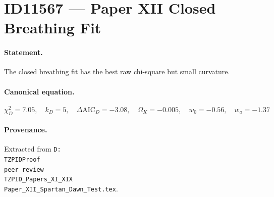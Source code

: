 \section*{ID11567 --- Paper XII Closed Breathing Fit}

\paragraph{Statement.}
The closed breathing fit has the best raw chi-square but small curvature.

\paragraph{Canonical equation.}
\[
\chi^2_D=7.05,\quad k_D=5,\quad\Delta\mathrm{AIC}_D=-3.08,\quad\Omega_K=-0.005,\quad w_0=-0.56,\quad w_a=-1.37
\]

\paragraph{Provenance.}
Extracted from \texttt{D:\\TZPIDProof\\peer\_review\\TZPID\_Papers\_XI\_XIX\\Paper\_XII\_Spartan\_Dawn\_Test.tex}.
